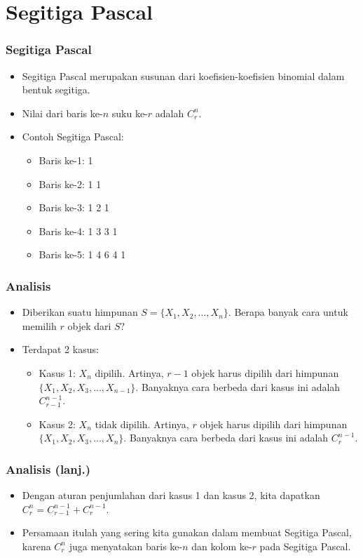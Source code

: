 \section{Segitiga Pascal}
\frame{\sectionpage}

\begin{frame}
\frametitle{Segitiga Pascal}
\begin{itemize}
  \item Segitiga Pascal merupakan susunan dari koefisien-koefisien binomial dalam bentuk segitiga.
  \item Nilai dari baris ke-$n$ suku ke-$r$ adalah $C^{n}_{r}$.
  \item Contoh Segitiga Pascal:
  \begin{itemize} 
    \item Baris ke-1: 1
    \item Baris ke-2: 1 1
    \item Baris ke-3: 1 2 1
    \item Baris ke-4: 1 3 3 1
    \item Baris ke-5: 1 4 6 4 1
  \end{itemize}
\end{itemize}
\end{frame}

\begin{frame}
\frametitle{Analisis}
\begin{itemize}
  \item Diberikan suatu himpunan $S = \{X_{1},X_{2},...,X_{n}\}$. Berapa banyak cara untuk memilih $r$ objek dari $S$?
  \item Terdapat 2 kasus:
  \begin{itemize}
    \item Kasus 1: $X_{n}$ dipilih.
    Artinya, $r-1$ objek harus dipilih dari himpunan $\{X_{1},X_{2},X_{3},...,X_{n-1}\}$. Banyaknya cara berbeda dari kasus ini adalah $C^{n-1}_{r-1}$.
    \item Kasus 2: $X_{n}$ tidak dipilih. Artinya, $r$ objek harus dipilih dari himpunan $\{X_{1},X_{2},X_{3},...,X_{n}\}$. Banyaknya cara berbeda dari kasus ini adalah $C^{n-1}_{r}$.
  \end{itemize}
\end{itemize}
\end{frame}

\begin{frame}
\frametitle{Analisis (lanj.)}
\begin{itemize}
  \item Dengan aturan penjumlahan dari kasus 1 dan kasus 2, kita dapatkan $C^{n}_{r} = C^{n-1}_{r-1} + C^{n-1}_{r}$.
  \item Persamaan itulah yang sering kita gunakan dalam membuat Segitiga Pascal, karena $C^n_r$ juga menyatakan baris ke-$n$ dan kolom ke-$r$ pada Segitiga Pascal.
\end{itemize}
\end{frame}

